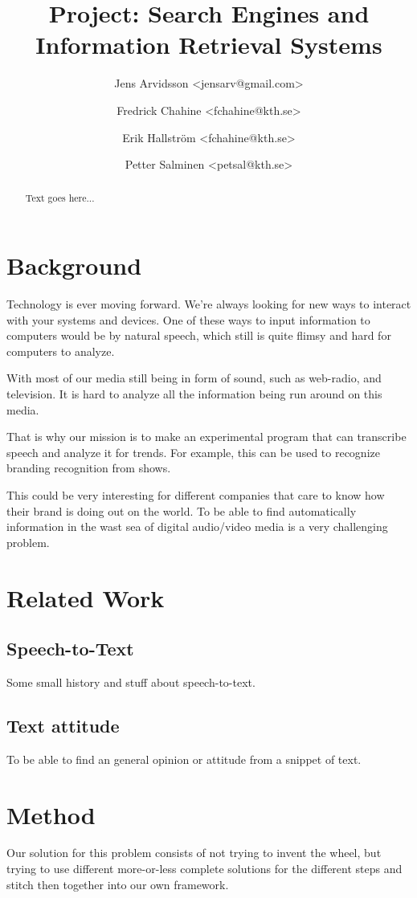 \documentclass[a4paper,11pt,twoside]{ltxdoc}
\title{Project: Search Engines and Information Retrieval Systems}
\author{
Jens Arvidsson <jensarv@gmail.com> \and
Fredrick Chahine <fchahine@kth.se> \and
Erik Hallström  <fchahine@kth.se> \and
Petter Salminen <petsal@kth.se>}
\begin{document}
\maketitle
\tableofcontents

\newpage
\begin{abstract}
Text goes here...

\end{abstract}

\newpage
\section{Background}
Technology is ever moving forward. We're always looking for new ways to interact with your systems and devices. One of these ways to input information to computers would be by natural speech, which still is quite flimsy and hard for computers to analyze. 

With most of our media still being in form of sound, such  as web-radio, and television. It is hard to analyze all the information being run around on this media. 

That is why our mission is to make an experimental program that can transcribe speech and analyze it for trends. For example, this can be used to recognize branding recognition from shows.

This could be very interesting for different companies that care to know how their brand is doing out on the world. To be able to find automatically information in the wast sea of digital audio/video media is a very challenging problem.



\section{Related Work}
\subsection{Speech-to-Text}
Some small history and stuff about speech-to-text.

\subsection{Text attitude}
To be able to find an general opinion or attitude from a snippet of text.

\section{Method}
Our solution for this problem consists of not trying to invent the wheel, but trying to use different more-or-less complete solutions for the different steps and stitch then together into our own framework.
\end{document}
